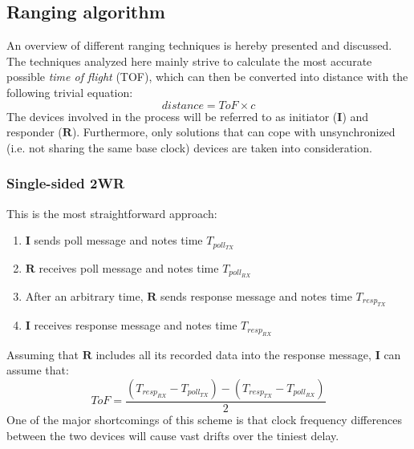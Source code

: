 \subsection{Ranging algorithm}
An overview of different ranging techniques is hereby presented and discussed.
The techniques analyzed here mainly strive to calculate the most accurate possible \emph{time of flight} (TOF), which can then be converted into distance with the following trivial equation:
\begin{equation}
    \textit{distance} = \textit{ToF} \times c
\end{equation}
The devices involved in the process will be referred to as initiator (\(\mathbf{I}\)) and responder (\(\mathbf{R}\)).
Furthermore, only solutions that can cope with unsynchronized (i.e. not sharing the same base clock) devices are taken into consideration.


\subsubsection{Single-sided 2WR}
This is the most straightforward approach:
\begin{enumerate}
    \item \(\mathbf{I}\) sends poll message and notes time \(T_{poll_{TX}}\)
    \item \(\mathbf{R}\) receives poll message and notes time \(T_{poll_{RX}}\)
    \item After an arbitrary time, \(\mathbf{R}\) sends response message and notes time \(T_{resp_{TX}}\)
    \item \(\mathbf{I}\) receives response message and notes time \(T_{resp_{RX}}\)
\end{enumerate}
Assuming that \(\mathbf{R}\) includes all its recorded data into the response message, \(\mathbf{I}\) can assume that:
\begin{equation}
    \textit{ToF} = \frac{(T_{resp_{RX}} - T_{poll_{TX}}) - (T_{resp_{TX}} - T_{poll_{RX}})}{2}
\end{equation}
One of the major shortcomings of this scheme is that clock frequency differences between the two devices will cause vast drifts over the tiniest delay.

